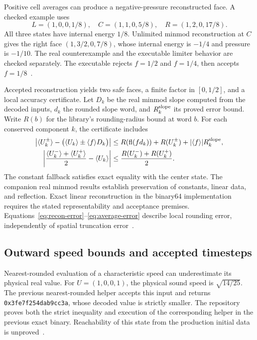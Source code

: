 \documentclass[11pt]{article}
\newcommand{\code}[1]{\texttt{#1}}
\newcommand{\val}[1]{\langle #1\rangle}
\newcommand{\fl}{\operatorname{fl}}
\begin{document}
Positive cell averages can produce a negative-pressure reconstructed face.  A checked example uses
\begin{equation}
L=(1,0,0,1/8),\quad C=(1,1,0,5/8),\quad R=(1,2,0,17/8).
\end{equation}
All three states have internal energy $1/8$.  Unlimited minmod reconstruction at $C$ gives the right face $(1,3/2,0,7/8)$, whose internal energy is $-1/4$ and pressure is $-1/10$.  The real counterexample and the executable limiter behavior are checked separately.  The executable rejects $f=1/2$ and $f=1/4$, then accepts $f=1/8$~\cite{counterexample}.

Accepted reconstruction yields two safe faces, a finite factor in $[0,1/2]$, and a local accuracy certificate.  Let $D_k$ be the real minmod slope computed from the decoded inputs, $d_k$ the rounded slope word, and $R_k^{\rm slope}$ its proved error bound.  Write $R(b)$ for the library's rounding-radius bound at word $b$.  For each conserved component $k$, the certificate includes
\begin{align}
\left|\val{U_k^{\pm}}-\bigl(\val{U_k}\pm\val{f}D_k\bigr)\right|
&\leq R(\fl(fd_k))+R(U_k^{\pm})+|\val{f}|R_k^{\rm slope},\label{eq:recon-error}\\
\left|\frac{\val{U_k^-}+\val{U_k^+}}2-\val{U_k}\right|
&\leq\frac{R(U_k^-)+R(U_k^+)}2.\label{eq:average-error}
\end{align}
The constant fallback satisfies exact equality with the center state.  The companion real minmod results establish preservation of constants, linear data, and reflection.  Exact linear reconstruction in the binary64 implementation requires the stated representability and acceptance premises.  Equations~\eqref{eq:recon-error}--\eqref{eq:average-error} describe local rounding error, independently of spatial truncation error~\cite{reconstructionaccuracy}.

\subsection{Outward speed bounds and accepted timesteps}

Nearest-rounded evaluation of a characteristic speed can underestimate its physical real value.  For $U=(1,0,0,1)$, the physical sound speed is $\sqrt{14/25}$.  The previous nearest-rounded helper accepts this input and returns \code{0x3fe7f254dab9cc3a}, whose decoded value is strictly smaller.  The repository proves both the strict inequality and execution of the corresponding helper in the previous exact binary.  Reachability of this state from the production initial data is unproved~\cite{speedcounterexample}.
\end{document}
